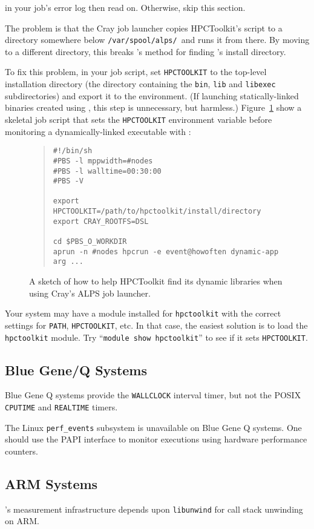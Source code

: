 \noindent 
in your job's error log then read on. Otherwise, skip this section.

The problem is that the Cray job launcher copies HPCToolkit's \hpcrun{}
script to a directory somewhere below \verb|/var/spool/alps/|\ and runs
it from there.  By moving \hpcrun{} to a different directory, this
breaks \hpcrun{}'s method for finding \HPCToolkit{}'s install directory.

To fix this problem, in your job script, set \verb|HPCTOOLKIT| to the top-level \HPCToolkit{} installation directory
(the directory containing the \verb|bin|, \verb|lib| and
\verb|libexec| subdirectories) and export it to the environment.  
(If launching statically-linked binaries created using \hpclink{}, this step is unnecessary, but harmless.)
Figure~\ref{cray-alps} show a skeletal job script that sets the \verb|HPCTOOLKIT| environment variable  before monitoring 
a dynamically-linked executable with \hpcrun{}: 

\begin{figure}
\begin{quote}
\begin{verbatim}
#!/bin/sh
#PBS -l mppwidth=#nodes
#PBS -l walltime=00:30:00
#PBS -V

export HPCTOOLKIT=/path/to/hpctoolkit/install/directory
export CRAY_ROOTFS=DSL

cd $PBS_O_WORKDIR
aprun -n #nodes hpcrun -e event@howoften dynamic-app arg ...
\end{verbatim}
\end{quote}
\caption{A sketch of how to help HPCToolkit find its dynamic libraries when using Cray's ALPS job launcher.} 
\label{cray-alps}
\end{figure}

Your system may have a module installed for \verb|hpctoolkit| with the
correct settings for \verb|PATH|, \verb|HPCTOOLKIT|, etc.  In that case,
the easiest solution is to load the \verb|hpctoolkit| module.  Try
``\verb|module show hpctoolkit|'' to see if it sets \verb|HPCTOOLKIT|.

\subsection{Blue Gene/Q Systems}
Blue Gene Q systems provide the \verb|WALLCLOCK| interval timer, but not the 
POSIX \verb|CPUTIME| and \verb|REALTIME| timers.

The Linux \verb|perf_events| subsystem is unavailable on Blue Gene Q systems. 
One should use the PAPI interface to monitor executions using hardware performance counters. 

\subsection{ARM Systems}
\HPCToolkit{}'s measurement infrastructure depends upon \verb|libunwind| for call stack unwinding on ARM.